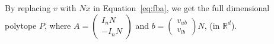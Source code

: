 \documentclass{beamer}
\begin{document}
\begin{frame}
      \footnotesize
      By replacing $v$ with $Nx$ in Equation~\ref{eq:fba}, we get the full dimensional polytope $P$,  
      where 
      $A = \begin{pmatrix} I_n N \\ -I_n N\end{pmatrix}$
      and 
      $b = \begin{pmatrix} v_{ub} \\ v_{lb} \end{pmatrix}  N$, (in $\mathbb{R}^d$).

   \end{frame}
\end{document}
